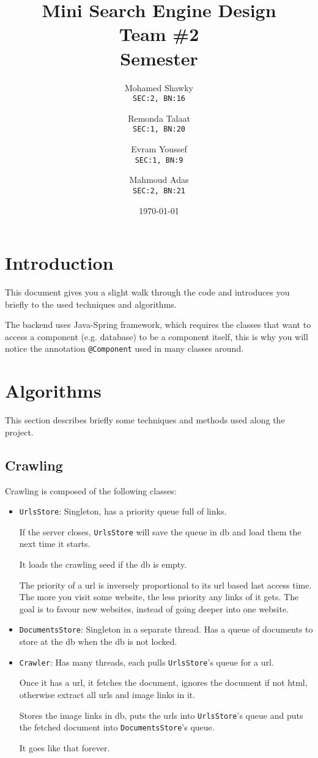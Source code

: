 \documentclass[12pt]{article}
\title{\textbf{Mini Search Engine Design}\\Team \#2\\ Semester}
\author{
  Mohamed Shawky\\
  \small\texttt{SEC:2, BN:16}
  \and
  Remonda Talaat\\
  \small\texttt{SEC:1, BN:20}
  \and
  Evram Youssef\\
  \small\texttt{SEC:1, BN:9}
  \and
  Mahmoud Adas\\
  \small\texttt{SEC:2, BN:21}
}
\date{\today}
\begin{document}
\thispagestyle{empty}

\maketitle
\tableofcontents
\clearpage


\section{Introduction}
This document gives you a slight walk through the code and introduces you briefly to the used techniques and algorithms.

The backend uses Java-Spring framework, which requires the classes that want to access a component (e.g. database) to be a component itself, this is why you will notice the annotation \texttt{@Component} used in many classes around.

\section{Algorithms}
This section describes briefly some techniques and methods used along the project.

\subsection{Crawling}
Crawling is composed of the following classes:
\begin{itemize}
  \item \texttt{UrlsStore}: Singleton, has a priority queue full of links. 
  
  If the server closes, \texttt{UrlsStore} will save the queue in db and load them the next time it starts. 
  
  It loads the crawling seed if the db is empty.

  The priority of a url is inversely proportional to its url based last access time.
  The more you visit some website, the less priority any links of it gets. The goal is to favour new websites, instead of going deeper into one website.

  \item \texttt{DocumentsStore}: Singleton in a separate thread.
  Has a queue of documents to store at the db when the db is not locked.

  \item \texttt{Crawler}: Has many threads, each pulls \texttt{UrlsStore}'s queue for a url.
  
  Once it has a url, it fetches the document, ignores the document if not html, otherwise extract all urls and image links in it.

  Stores the image links in db, puts the urls into \texttt{UrlsStore}'s queue and puts the fetched document into \texttt{DocumentsStore}'s queue.

  It goes like that forever.
\end{itemize}
\end{document}
